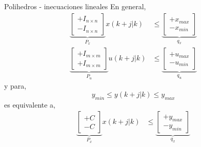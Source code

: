 \documentclass[8pt]{beamer}
\begin{document}
\begin{frame}[fragile]{Polihedros - inecuaciones lineales}
	En general,
	\begin{equation*}
	\begin{aligned}
		{\underbrace{
			\begin{bmatrix}
			+I_{n\times n} \\
			-I_{n\times n}
			\end{bmatrix}}_{P_x}
		}
		x(k+j|k) & \leq
		{\underbrace{
			\begin{bmatrix}
			+x_{max}\\
			-x_{min}
			\end{bmatrix}}_{q_x}
		}
		\\
		{\underbrace{
			\begin{bmatrix}
			+I_{m\times m} \\
			+I_{m\times m}
			\end{bmatrix}}_{P_u}
		}
		u(k+j|k) & \leq
		{\underbrace{
			\begin{bmatrix}
			+u_{max}\\
			-u_{min}
			\end{bmatrix}}_{q_u}
		}
	\end{aligned}
	\end{equation*}
	y para,
	\begin{equation*}
	y_{min} \leq y(k+j|k) \leq y_{max}
	\end{equation*}
	es equivalente a,
	\begin{equation*}
	\begin{aligned}
		{\underbrace{
			\begin{bmatrix}
			+C \\
			-C
			\end{bmatrix}}_{P_x}
		}
		x(k+j|k) & \leq
		{\underbrace{
			\begin{bmatrix}
			+y_{max}\\
			-y_{min}
			\end{bmatrix}}_{q_x}
		}
	\end{aligned}
	\end{equation*}
	
\end{frame}
\end{document}
